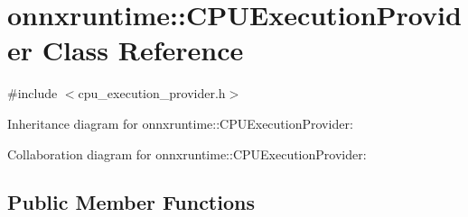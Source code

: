 \hypertarget{classonnxruntime_1_1CPUExecutionProvider}{}\section{onnxruntime\+:\+:C\+P\+U\+Execution\+Provider Class Reference}
\label{classonnxruntime_1_1CPUExecutionProvider}


{\ttfamily \#include $<$cpu\+\_\+execution\+\_\+provider.\+h$>$}



Inheritance diagram for onnxruntime\+:\+:C\+P\+U\+Execution\+Provider\+:


Collaboration diagram for onnxruntime\+:\+:C\+P\+U\+Execution\+Provider\+:
\subsection*{Public Member Functions}
